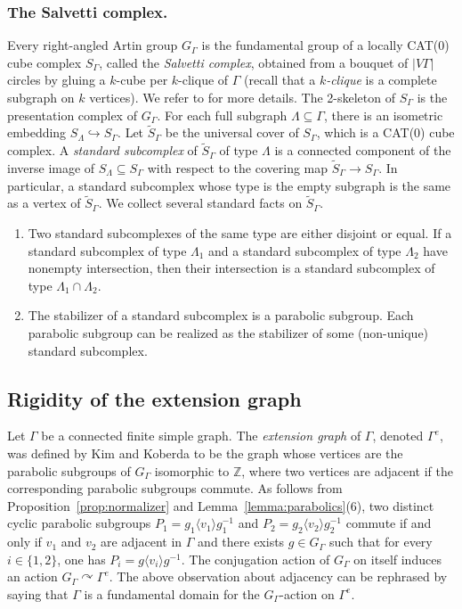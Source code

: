\documentclass[JEP,XML,SOM,Unicode,NoFloatCountersInSection,published]{cedram}
\theoremstyle{plain}
\theoremstyle{definition}
\let\actson\curvearrowright
\begin{document}
\subsubsection*{The Salvetti complex.} Every right-angled Artin group $G_\Gamma$ is the fundamental group of a locally CAT(0) cube complex $S_\Gamma$, called the \emph{Salvetti complex}, obtained from a bouquet of $|V\Gamma|$ circles by gluing a $k$-cube per $k$-clique of $\Gamma$ (recall that a \emph{$k$-clique} is a complete subgraph on $k$ vertices). We refer to \cite[\S 3.6]{charney2007introduction} for more details. The 2-skeleton of $S_\Gamma$ is the presentation complex of $G_\Gamma$. For each full subgraph $\Lambda\subseteq \Gamma$, there is an isometric embedding $S_{\Lambda}\hookrightarrow S_\Gamma$. Let $\widetilde{S}_\Gamma$ be the universal cover of $S_\Gamma$, which is a CAT(0) cube complex. A \emph{standard subcomplex} of $\widetilde{S}_\Gamma$ of type $\Lambda$ is a connected component of the inverse image of $S_{\Lambda}\subseteq S_\Gamma$ with respect to the covering map $\widetilde{S}_\Gamma\to S_\Gamma$. In particular, a standard subcomplex whose type is the empty subgraph is the same as a vertex of $\widetilde{S}_\Gamma$. We collect several standard facts on $\widetilde{S}_\Gamma$.
\begin{enumerate}
\item Two standard subcomplexes of the same type are either disjoint or equal. If a standard subcomplex of type $\Lambda_1$ and a standard subcomplex of type $\Lambda_2$ have nonempty intersection, then their intersection is a standard subcomplex of type $\Lambda_1\cap\Lambda_2$.
\item The stabilizer of a standard subcomplex is a parabolic subgroup. Each parabolic subgroup can be realized as the stabilizer of some (non-unique) standard subcomplex.
\end{enumerate}

\subsection{Rigidity of the extension graph}\label{sec:rigidity}

Let $\Gamma$ be a connected finite simple graph. The \emph{extension graph} of $\Gamma$, denoted $\Gamma^e$, was defined by Kim and Koberda \cite{kim2013embedability} to be the graph whose vertices are the parabolic subgroups of $G_\Gamma$ isomorphic to $\mathbb Z$, where two vertices are adjacent if the corresponding parabolic subgroups commute. As follows from Proposition~\ref{prop:normalizer} and Lemma~\ref{lemma:parabolics}(6), two distinct cyclic parabolic subgroups $P_1=g_1\langle v_1\rangle g_1^{-1}$ and $P_2=g_2\langle v_2\rangle g_2^{-1}$ commute if and only if $v_1$ and $v_2$ are adjacent in $\Gamma$ and there exists $g\in G_\Gamma$ such that for every $i\in\{1,2\}$, one has $P_i=g\langle v_i\rangle g^{-1}$. The conjugation action of $G_\Gamma$ on itself induces an action $G_\Gamma\actson \Gamma^e$. The above observation about adjacency can be rephrased by saying that $\Gamma$ is a fundamental domain for the $G_\Gamma$-action on $\Gamma^e$.
\end{document}
